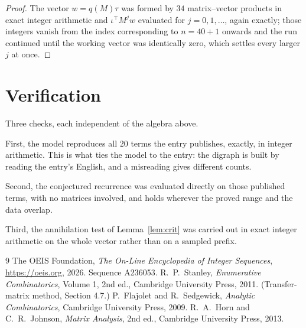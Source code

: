 \documentclass[11pt,a4paper]{article}
\theoremstyle{plain}
\theoremstyle{definition}
\begin{document}
\begin{proof}
The vector $w=q(M)\tau$ was formed by $34$ matrix--vector products in exact integer
arithmetic and $\iota^{\!\top}M^{j}w$ evaluated for $j=0,1,\dots$, again exactly; those
integers vanish from the index corresponding to $n=40+1$ onwards and the run continued
until the working vector was identically zero, which settles every larger $j$ at once.
\end{proof}

\section{Verification}

Three checks, each independent of the algebra above.

First, the model reproduces all $20$ terms the entry publishes, exactly, in integer
arithmetic. This is what ties the model to the entry: the digraph is built by reading the
entry's English, and a misreading gives different counts.

Second, the conjectured recurrence was evaluated directly on those published terms, with no
matrices involved, and holds wherever the proved range and the data overlap.

Third, the annihilation test of Lemma~\ref{lem:crit} was carried out in exact integer
arithmetic on the whole vector rather than on a sampled prefix.

\begin{thebibliography}{9}
 The OEIS Foundation, \emph{The On-Line Encyclopedia of Integer
Sequences}, \url{https://oeis.org}, 2026. Sequence A236053.
 R.~P.~Stanley, \emph{Enumerative Combinatorics}, Volume 1, 2nd ed.,
Cambridge University Press, 2011. (Transfer-matrix method, Section 4.7.)
 P.~Flajolet and R.~Sedgewick, \emph{Analytic Combinatorics}, Cambridge
University Press, 2009.
 R.~A.~Horn and C.~R.~Johnson, \emph{Matrix Analysis}, 2nd ed., Cambridge
University Press, 2013.
\end{thebibliography}
\end{document}
